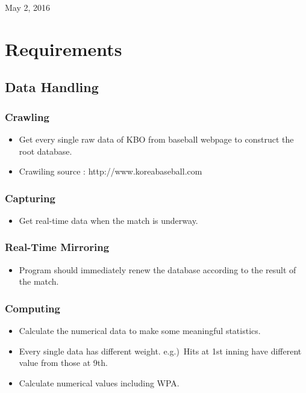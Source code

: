 \documentclass[conference,compsoc, twocolumn]{IEEEtran}
\begin{document}
\hfill May 2, 2016



\section{Requirements}



\subsection{Data Handling}


\subsubsection{Crawling}
\begin{itemize}
\item Get every single raw data of  KBO from baseball webpage to construct the root database.
\item Crawiling source : http://www.koreabaseball.com
\end{itemize}

\subsubsection{Capturing}
\begin{itemize}
\item Get real-time data when the match is underway.
\end{itemize}

\subsubsection{Real-Time Mirroring}
\begin{itemize}
\item Program should immediately renew the database according to the result of the match.
\end{itemize}

\subsubsection{Computing}
\begin{itemize}
\item Calculate the numerical data to make some meaningful statistics.
\item Every single data has different weight.
e.g.)\ Hits at 1st inning have different value from those at 9th.
\item Calculate numerical values including WPA.
\end{itemize}
\end{document}
